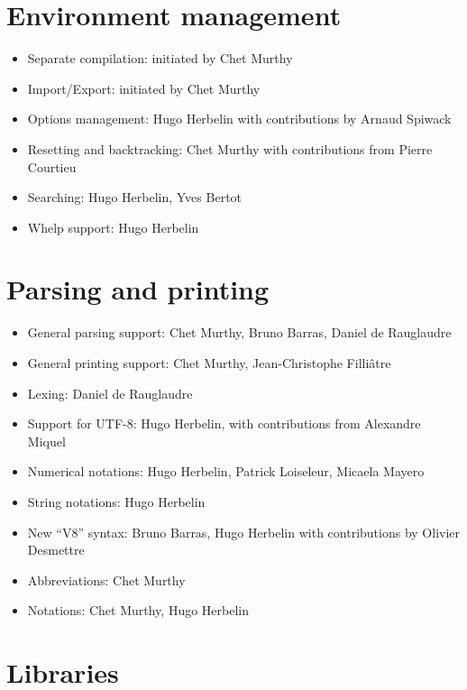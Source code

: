 \documentclass{article}
\begin{document}
\section{Environment management}

\begin{itemize}
\item Separate compilation: initiated by Chet Murthy
\item Import/Export: initiated by Chet Murthy
\item Options management: Hugo Herbelin with contributions by Arnaud Spiwack
\item Resetting and backtracking: Chet Murthy with contributions from Pierre Courtieu
\item Searching: Hugo Herbelin, Yves Bertot
\item Whelp support: Hugo Herbelin
\end{itemize}

\section{Parsing and printing}

\begin{itemize}
\item General parsing support: Chet Murthy, Bruno Barras, Daniel de Rauglaudre
\item General printing support: Chet Murthy, Jean-Christophe Filliâtre
\item Lexing: Daniel de Rauglaudre
\item Support for UTF-8: Hugo Herbelin, with contributions from Alexandre Miquel
\item Numerical notations: Hugo Herbelin, Patrick Loiseleur, Micaela Mayero
\item String notations: Hugo Herbelin
\item New ``V8'' syntax: Bruno Barras, Hugo Herbelin with contributions by Olivier Desmettre
\item Abbreviations: Chet Murthy
\item Notations: Chet Murthy, Hugo Herbelin
\end{itemize}

\section{Libraries}
\end{document}

